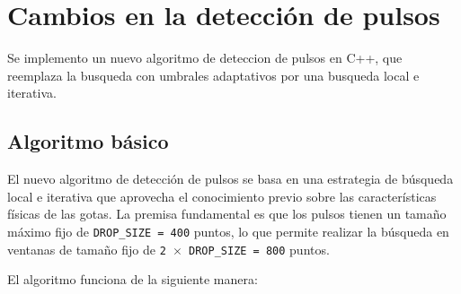 \documentclass[12pt,a4paper]{article}
\begin{document}
\section{Cambios en la detección de pulsos}
\lhead{}

Se implemento un nuevo algoritmo de deteccion de pulsos en C++, que reemplaza la busqueda con umbrales adaptativos por una busqueda local e iterativa.

\subsection{Algoritmo básico}

El nuevo algoritmo de detección de pulsos se basa en una estrategia de búsqueda local e iterativa que aprovecha el conocimiento previo sobre las características físicas de las gotas. La premisa fundamental es que los pulsos tienen un tamaño máximo fijo de \texttt{DROP\_SIZE = 400} puntos, lo que permite realizar la búsqueda en ventanas de tamaño fijo de \texttt{2 $\times$ DROP\_SIZE = 800} puntos.

El algoritmo funciona de la siguiente manera:
\end{document}
